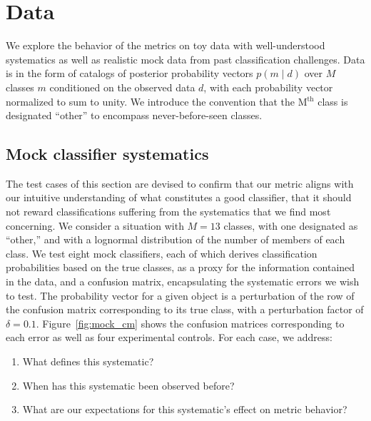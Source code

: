 \section{Data}
\label{sec:data}

We explore the behavior of the metrics on toy data with well-understood systematics as well as realistic mock data from past classification challenges.
Data is in the form of catalogs of posterior probability vectors $p(m \mid d)$ over $M$ classes $m$ conditioned on the observed data $d$, with each probability vector normalized to sum to unity.
We introduce the convention that the M$^{\mathrm{th}}$ class is designated ``other'' to encompass never-before-seen classes.

\subsection{Mock classifier systematics}
\label{sec:mockdata}

The test cases of this section are devised to confirm that our metric aligns with our intuitive understanding of what constitutes a good classifier, that it should not reward classifications suffering from the systematics that we find most concerning.
We consider a situation with $M=13$ classes, with one designated as ``other,'' and with a lognormal distribution of the number of members of each class.
We test eight mock classifiers, each of which derives classification probabilities based on the true classes, as a proxy for the information contained in the data, and a confusion matrix, encapsulating the systematic errors we wish to test.
The probability vector for a given object is a perturbation of the row of the confusion matrix corresponding to its true class, with a perturbation factor of $\delta=0.1$.
Figure~\ref{fig:mock_cm} shows the confusion matrices corresponding to each error as well as four experimental controls.
For each case, we address:
\begin{enumerate}
  \item What defines this systematic?
  \item When has this systematic been observed before?
  \item What are our expectations for this systematic's effect on metric behavior?
\end{enumerate}

